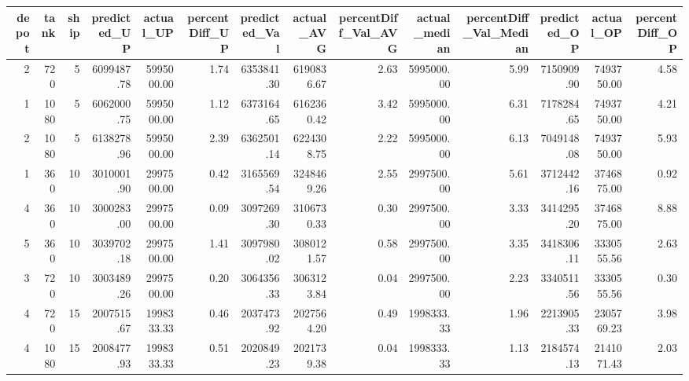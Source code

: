 \begin{tabular}{rrrrrrrrrrrrrr}
\toprule
 depot &  tank &  ship &  predicted\_UP &  actual\_UP &  percentDiff\_UP &  predicted\_Val &  actual\_AVG &  percentDiff\_Val\_AVG &  actual\_median &  percentDiff\_Val\_Median &  predicted\_OP &  actual\_OP &  percentDiff\_OP \\
\midrule
     2 &   720 &     5 &    6099487.78 & 5995000.00 &            1.74 &     6353841.30 &  6190836.67 &                 2.63 &     5995000.00 &                    5.99 &    7150909.90 & 7493750.00 &            4.58 \\
     1 &  1080 &     5 &    6062000.75 & 5995000.00 &            1.12 &     6373164.65 &  6162360.42 &                 3.42 &     5995000.00 &                    6.31 &    7178284.65 & 7493750.00 &            4.21 \\
     2 &  1080 &     5 &    6138278.96 & 5995000.00 &            2.39 &     6362501.14 &  6224308.75 &                 2.22 &     5995000.00 &                    6.13 &    7049148.08 & 7493750.00 &            5.93 \\
     1 &   360 &    10 &    3010001.90 & 2997500.00 &            0.42 &     3165569.54 &  3248469.26 &                 2.55 &     2997500.00 &                    5.61 &    3712442.16 & 3746875.00 &            0.92 \\
     4 &   360 &    10 &    3000283.00 & 2997500.00 &            0.09 &     3097269.30 &  3106730.33 &                 0.30 &     2997500.00 &                    3.33 &    3414295.20 & 3746875.00 &            8.88 \\
     5 &   360 &    10 &    3039702.18 & 2997500.00 &            1.41 &     3097980.02 &  3080121.57 &                 0.58 &     2997500.00 &                    3.35 &    3418306.11 & 3330555.56 &            2.63 \\
     3 &   720 &    10 &    3003489.26 & 2997500.00 &            0.20 &     3064356.33 &  3063123.84 &                 0.04 &     2997500.00 &                    2.23 &    3340511.56 & 3330555.56 &            0.30 \\
     4 &   720 &    15 &    2007515.67 & 1998333.33 &            0.46 &     2037473.92 &  2027564.20 &                 0.49 &     1998333.33 &                    1.96 &    2213905.33 & 2305769.23 &            3.98 \\
     4 &  1080 &    15 &    2008477.93 & 1998333.33 &            0.51 &     2020849.23 &  2021739.38 &                 0.04 &     1998333.33 &                    1.13 &    2184574.13 & 2141071.43 &            2.03 \\

\end{tabular}
